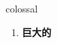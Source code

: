 
\begin{frame}
{\huge colossal}
\begin{center}
\begin{enumerate}\Large
  \item \textbf{巨大的}
\end{enumerate}
\end{center}
\end{frame}
